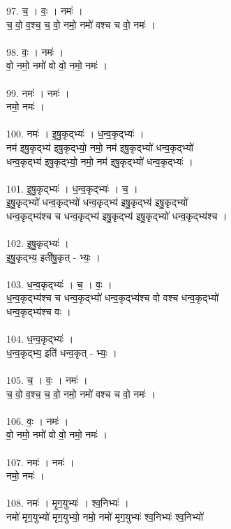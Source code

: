 97. च॒ । वः॒ । नमः॑ ।\\
च॒ वो॒ व॒श्च॒ च॒ वो॒ नमो॒ नमो॑ वश्च च वो॒ नमः॑ ।\\
\\
98. वः॒ । नमः॑ ।\\
वो॒ नमो॒ नमो॑ वो वो॒ नमो॒ नमः॑ ।\\
\\
99. नमः॑ । नमः॑ ।\\
नमो॒ नमः॑ ।\\
\\
100. नमः॑ । इ॒षु॒कृद्भ्यः॑ । ध॒न्व॒कृद्भ्यः॑ ।\\
नम॑ इषु॒कृद्भ्य॑ इषु॒कृद्भ्यो॒ नमो॒ नम॑ इषु॒कृद्भ्यो॑ धन्व॒कृद्भ्यो॑\\
धन्व॒कृद्भ्य॑ इषु॒कृद्भ्यो॒ नमो॒ नम॑ इषु॒कृद्भ्यो॑ धन्व॒कृद्भ्यः॑ ।\\
\\
101. इ॒षु॒कृद्भ्यः॑ । ध॒न्व॒कृद्भ्यः॑ । च॒ ।\\
इ॒षु॒कृद्भ्यो॑ धन्व॒कृद्भ्यो॑ धन्व॒कृद्भ्य॑ इषु॒कृद्भ्य॑ इषु॒कृद्भ्यो॑\\
धन्व॒कृद्भ्य॑श्च च धन्व॒कृद्भ्य॑ इषु॒कृद्भ्य॑ इषु॒कृद्भ्यो॑ धन्व॒कृद्भ्य॑श्च ।\\
\\
102. इ॒षु॒कृद्भ्यः॑ ।\\
इ॒षु॒कृद्भ्य॒ इती॑षु॒कृत् - भ्यः॒ ।\\
\\
103. ध॒न्व॒कृद्भ्यः॑ । च॒ । वः॒ ।\\
ध॒न्व॒कृद्भ्य॑श्च च धन्व॒कृद्भ्यो॑ धन्व॒कृद्भ्य॑श्च वो वश्च धन्व॒कृद्भ्यो॑\\
धन्व॒कृद्भ्य॑श्च वः ।\\
\\
104. ध॒न्व॒कृद्भ्यः॑ ।\\
ध॒न्व॒कृद्भ्य॒ इति॑ धन्व॒कृत् - भ्यः॒ ।\\
\\
105. च॒ । वः॒ । नमः॑ ।\\
च॒ वो॒ व॒श्च॒ च॒ वो॒ नमो॒ नमो॑ वश्च च वो॒ नमः॑ ।\\
\\
106. वः॒ । नमः॑ ।\\
वो॒ नमो॒ नमो॑ वो वो॒ नमो॒ नमः॑ ।\\
\\
107. नमः॑ । नमः॑ ।\\
नमो॒ नमः॑ ।\\
\\
108. नमः॑ । मृ॒ग॒युभ्यः॑ । श्व॒निभ्यः॑ ।\\
नमो॑ मृग॒युभ्यो॑ मृग॒युभ्यो॒ नमो॒ नमो॑ मृग॒युभ्यः॑ श्व॒निभ्यः॑ श्व॒निभ्यो॑\\
